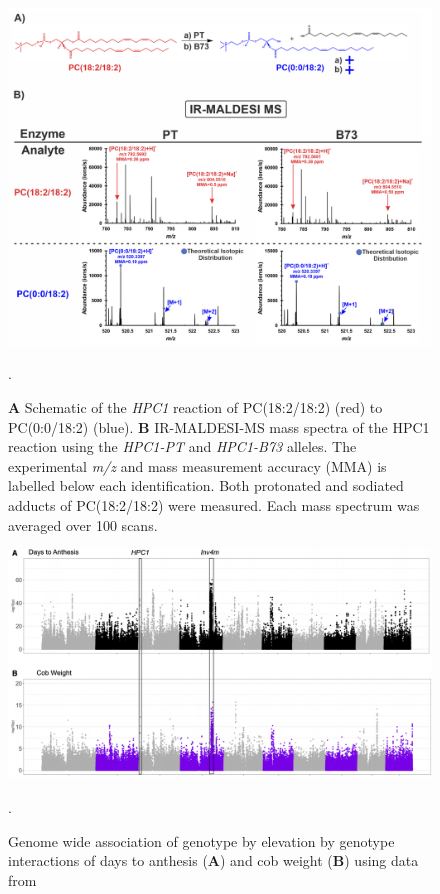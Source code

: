 \documentclass[9pt,twocolumn,twoside,lineno]{biorxiv}
\newcommand{\hpc}{\textit{HPC1}\xspace}
\begin{document}
\clearpage

\begin{figure}[t]
\begin{center}
\includegraphics[width=0.6 \paperwidth]{Sup_Figures/Sup_Fig_8.png}
\caption{ \textbf{A} Schematic of the \hpc reaction of PC(18:2/18:2) (red) to
PC(0:0/18:2) (blue). 
\textbf{B} IR-MALDESI-MS mass spectra of the HPC1 reaction using the \textit{HPC1-PT} and \textit{HPC1-B73} alleles. The
experimental \textit{m/z} and mass measurement accuracy (MMA) is labelled below each
identification. Both protonated and sodiated adducts of PC(18:2/18:2) were measured. 
Each mass spectrum was averaged over 100 scans.}.
\label{figure:Sup:MS_spectra}
\end{center}
\end{figure} 

\clearpage

\begin{figure}[t]
\begin{center}
\includegraphics[width=0.8 \paperwidth]{Sup_Figures/Sup_Fig_9.png}
\caption{Genome wide association of genotype by elevation by genotype interactions of days to anthesis (\textbf{A}) and cob weight (\textbf{B}) using data from \cite{Gates2019-xu}}.
\label{figure:Sup:GxE_scan}
\end{center}
\end{figure} 
\end{document}
